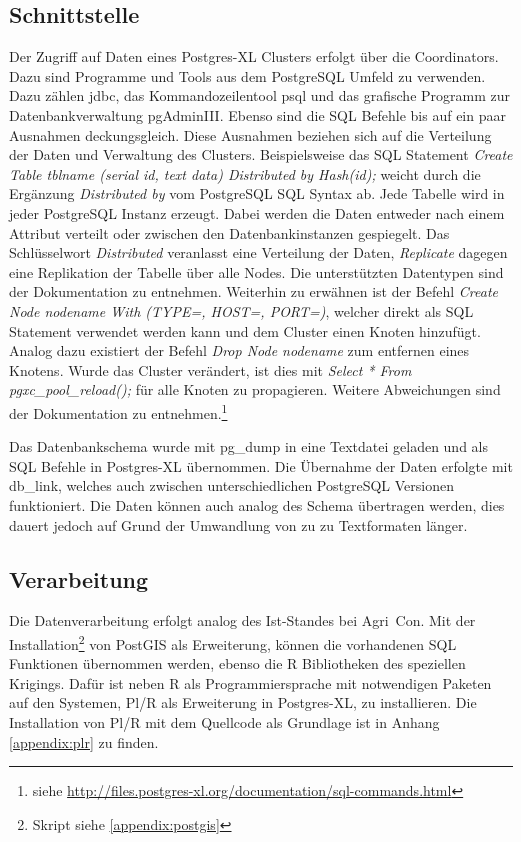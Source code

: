 \subsection{Schnittstelle}
\label{subsection:interface}
Der Zugriff auf Daten eines Postgres-XL Clusters erfolgt über die Coordinators.
Dazu sind Programme und Tools aus dem PostgreSQL Umfeld zu verwenden.
Dazu zählen \Gls{jdbc}, das Kommandozeilentool psql und das grafische Programm zur Datenbankverwaltung pgAdminIII.
Ebenso sind die SQL Befehle bis auf ein paar Ausnahmen deckungsgleich.
Diese Ausnahmen beziehen sich auf die Verteilung der Daten und Verwaltung des Clusters.
Beispielsweise das SQL Statement \textit{Create Table tblname (serial id, text data) Distributed by Hash(id);} weicht durch die Ergänzung \textit{Distributed by} vom PostgreSQL SQL Syntax ab.
Jede Tabelle wird in jeder PostgreSQL Instanz erzeugt.
Dabei werden die Daten entweder nach einem Attribut verteilt oder zwischen den Datenbankinstanzen gespiegelt.
Das Schlüsselwort \textit{Distributed} veranlasst eine Verteilung der Daten, \textit{Replicate} dagegen eine Replikation der Tabelle über alle Nodes.
Die unterstützten Datentypen sind der Dokumentation zu entnehmen.
Weiterhin zu erwähnen ist der Befehl \textit{Create Node nodename With (TYPE=, HOST=, PORT=)}, welcher direkt als SQL Statement verwendet werden kann und dem Cluster einen Knoten hinzufügt.
Analog dazu existiert der Befehl \textit{Drop Node nodename} zum entfernen eines Knotens.
Wurde das Cluster verändert, ist dies mit \textit{Select * From pgxc\_{}pool\_{}reload();} für alle Knoten zu propagieren.
Weitere Abweichungen sind der Dokumentation zu entnehmen.\footnote{siehe \url{http://files.postgres-xl.org/documentation/sql-commands.html}}

Das Datenbankschema wurde mit pg\_{}dump in eine Textdatei geladen und als SQL Befehle in Postgres-XL übernommen.
Die Übernahme der Daten erfolgte mit db\_{}link, welches auch zwischen unterschiedlichen PostgreSQL Versionen funktioniert.
Die Daten können auch analog des Schema übertragen werden, dies dauert jedoch auf Grund der Umwandlung von zu zu Textformaten länger.

\subsection{Verarbeitung}
Die Datenverarbeitung erfolgt analog des Ist-Standes bei Agri~Con.
Mit der Installation\footnote{Skript siehe \ref{appendix:postgis}} von PostGIS als Erweiterung, können die vorhandenen SQL Funktionen übernommen werden, ebenso die R Bibliotheken des speziellen Krigings.
Dafür ist neben R als Programmiersprache mit notwendigen Paketen auf den Systemen, Pl/R als Erweiterung in Postgres-XL, zu installieren.
Die Installation von Pl/R mit dem Quellcode als Grundlage ist in Anhang \ref{appendix:plr} zu finden.

